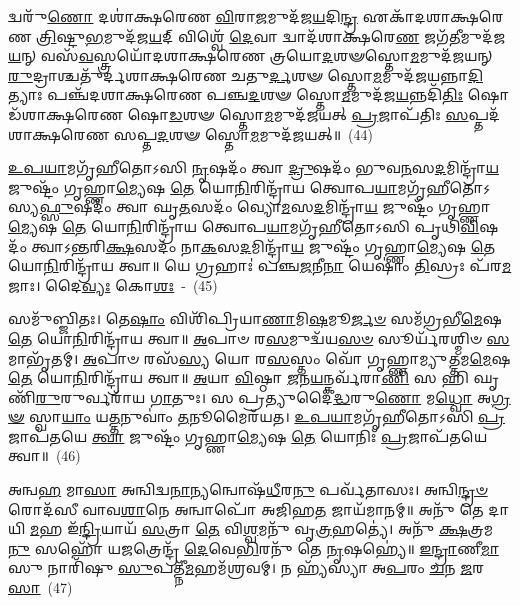 𑌦𑍍𑌵𑌰𑍁᳴\-\ul{𑌣𑍋} 𑌦𑌶𑌾॑𑌕𑍍𑌷𑌰𑍇𑌣 \ul{𑌵𑌿}\-𑌰𑌾\-\ul{𑌜}\-𑌮𑍁𑌦᳴𑌜\-\ul{𑌯}\-𑌦𑌿\-\ul{𑌨𑍍𑌦𑍍𑌰} 𑌏𑌕𑌾᳴\-𑌦𑌶𑌾\-𑌕𑍍𑌷𑌰𑍇𑌣 \ul{𑌤𑍍𑌰𑌿}\-𑌷𑍍𑌟𑍁\-\ul{𑌭}\-𑌮𑍁𑌦᳴𑌜\-\ul{𑌯}\-𑌦𑍍 𑌵𑌿𑌶𑍍𑌵𑍇᳴ \ul{𑌦𑍇}\-𑌵𑌾 𑌦𑍍𑌵𑌾𑌦᳴𑌶𑌾𑌕𑍍𑌷𑌰𑍇\-\ul{𑌣} 𑌜𑌗᳴\-\ul{𑌤𑍀}\-𑌮𑍁𑌦᳴𑌜\-\ul{𑌯}\-𑌨𑍍 𑌵𑌸᳴\-\ul{𑌵}\-𑌸𑍍𑌤𑍍𑌰𑌯𑍋᳴\-𑌦𑌶𑌾\-𑌕𑍍𑌷𑌰𑍇𑌣 𑌤𑍍𑌰𑌯𑍋\-\ul{𑌦}\-𑌶𑍟𑌸𑍍𑌤𑍋\-\ul{𑌮}\-𑌮𑍁𑌦᳴𑌜𑌯𑌨𑍍 \ul{𑌰𑍁}\-𑌦𑍍𑌰𑌾𑌶𑍍𑌚𑌤𑍁᳴𑌰𑍍𑌦𑌶𑌾\-𑌕𑍍𑌷𑌰𑍇𑌣 𑌚𑌤𑍁\-\ul{𑌰𑍍𑌦}\-𑌶𑍟 𑌸𑍍𑌤𑍋\-\ul{𑌮}\-𑌮𑍁𑌦᳴𑌜𑌯𑌨𑍍𑌨𑌾\-\ul{𑌦𑌿}\-𑌤𑍍𑌯𑌾𑌃 𑌪𑌞𑍍𑌚᳴\-𑌦𑌶𑌾\-𑌕𑍍𑌷𑌰𑍇𑌣 𑌪𑌞𑍍𑌚\-\ul{𑌦}\-𑌶𑍟 𑌸𑍍𑌤𑍋\-\ul{𑌮}\-𑌮𑍁𑌦᳴𑌜\-\ul{𑌯}\-𑌨𑍍𑌨𑌦𑌿᳴\-\ul{𑌤𑌿𑌃} 𑌷𑍋𑌡᳴𑌶𑌾𑌕𑍍𑌷𑌰𑍇𑌣 𑌷𑍋\-\ul{𑌡}\-𑌶𑍟 𑌸𑍍𑌤𑍋\-\ul{𑌮}\-𑌮𑍁𑌦᳴𑌜𑌯𑌤𑍍 \ul{𑌪𑍍𑌰}\-𑌜𑌾𑌪᳴𑌤𑌿𑌃 \ul{𑌸}\-𑌪𑍍𑌤𑌦᳴𑌶𑌾𑌕𑍍𑌷𑌰𑍇𑌣 𑌸𑌪𑍍𑌤\-\ul{𑌦}\-𑌶𑍟 𑌸𑍍𑌤𑍋\-\ul{𑌮}\-𑌮𑍁𑌦᳴𑌜𑌯𑌤𑍍॥~(44)

{\anuvakamend[{\-\ul{𑌅}\-\-\ul{𑌜}\-\-\ul{𑌯}\-𑌤𑍍 𑌷𑌟𑍍𑌚᳴𑌤𑍍𑌵𑌾𑌰𑌿𑍞𑌶𑌚𑍍𑌚}]}%

\-\ul{𑌉}\-\-\ul{𑌪}\-\-\ul{𑌯𑌾}\-𑌮𑌗𑍃᳴𑌹𑍀𑌤𑍋\-𑌽𑌸𑌿 \ul{𑌨𑍃}\-𑌷𑌦𑌂᳴ 𑌤𑍍𑌵𑌾 \ul{𑌦𑍍𑌰𑍁}\-𑌷𑌦𑌂᳴ 𑌭𑍁𑌵\-\ul{𑌨}\-𑌸\-\ul{𑌦}\-𑌮𑌿𑌨𑍍𑌦𑍍𑌰𑌾᳴\-\ul{𑌯} 𑌜𑍁𑌷𑍍𑌟𑌂᳴ 𑌗𑍃𑌹𑍍𑌣𑌾\-\ul{𑌮𑍍𑌯𑍇}\-𑌷 \ul{𑌤𑍇} 𑌯𑍋\-\ul{𑌨𑌿}\-𑌰𑌿𑌨𑍍𑌦𑍍𑌰𑌾᳴𑌯 𑌤𑍍𑌵𑍋𑌪\-\ul{𑌯𑌾}\-𑌮𑌗𑍃᳴𑌹𑍀𑌤𑍋\-𑌽𑌸𑍍𑌯\-\ul{𑌫𑍍𑌸𑍁}\-𑌷𑌦𑌂᳴ 𑌤𑍍𑌵𑌾 𑌘𑍃\-\ul{𑌤}\-𑌸𑌦𑌂᳴ 𑌵𑍍𑌯𑍋\-\ul{𑌮}\-𑌸\-\ul{𑌦}\-𑌮𑌿𑌨𑍍𑌦𑍍𑌰𑌾᳴\-\ul{𑌯} 𑌜𑍁𑌷𑍍𑌟𑌂᳴ 𑌗𑍃𑌹𑍍𑌣𑌾\-\ul{𑌮𑍍𑌯𑍇}\-𑌷 \ul{𑌤𑍇} 𑌯𑍋\-\ul{𑌨𑌿}\-𑌰𑌿𑌨𑍍𑌦𑍍𑌰𑌾᳴𑌯 𑌤𑍍𑌵𑍋𑌪\-\ul{𑌯𑌾}\-𑌮𑌗𑍃᳴𑌹𑍀𑌤𑍋\-𑌽𑌸𑌿 𑌪𑍃𑌥𑌿\-\ul{𑌵𑌿}\-𑌷𑌦𑌂᳴ 𑌤𑍍𑌵𑌾\-𑌽𑌨𑍍𑌤𑌰𑌿\-\ul{𑌕𑍍𑌷}\-𑌸𑌦𑌂᳴ 𑌨𑌾\-\ul{𑌕}\-𑌸\-\ul{𑌦}\-𑌮𑌿𑌨𑍍𑌦𑍍𑌰𑌾᳴\-\ul{𑌯} 𑌜𑍁𑌷𑍍𑌟𑌂᳴ 𑌗𑍃𑌹𑍍𑌣𑌾\-\ul{𑌮𑍍𑌯𑍇}\-𑌷 \ul{𑌤𑍇} 𑌯𑍋\-\ul{𑌨𑌿}\-𑌰𑌿𑌨𑍍𑌦𑍍𑌰𑌾᳴𑌯 𑌤𑍍𑌵𑌾॥ 𑌯𑍇 𑌗𑍍𑌰𑌹𑌾𑌃॑ 𑌪𑌞𑍍𑌚\-\ul{𑌜}\-𑌨𑍀\-\ul{𑌨𑌾} 𑌯𑍇𑌷𑌾𑌂॑ \ul{𑌤𑌿}\-𑌸𑍍𑌰𑌃 𑌪᳴𑌰\-\ul{𑌮}\-𑌜𑌾𑌃। 𑌦𑍈\-\ul{𑌵𑍍𑌯𑌃} 𑌕𑍋\-\ul{𑌶𑌃}\-~-~(45)

𑌸𑌮𑍁᳴𑌬𑍍𑌜𑌿𑌤𑌃। 𑌤𑍇\-\ul{𑌷𑌾𑌂} 𑌵𑌿𑌶𑌿᳴𑌪𑍍𑌰𑌿𑌯𑌾\-\ul{𑌣𑌾}\-𑌮𑌿\-\ul{𑌷}\-𑌮𑍂\-\ul{𑌰𑍍𑌜}\-\-\ul{𑍞} 𑌸𑌮᳴𑌗𑍍𑌰𑌭𑍀\-\ul{𑌮𑍇}\-𑌷 \ul{𑌤𑍇} 𑌯𑍋\-\ul{𑌨𑌿}\-𑌰𑌿𑌨𑍍𑌦𑍍𑌰𑌾᳴𑌯 𑌤𑍍𑌵𑌾॥ \ul{𑌅}\-𑌪𑌾𑍞 𑌰\-\ul{𑌸}\-𑌮𑍁𑌦𑍍𑌵᳴𑌯\-\ul{𑌸}\-\-\ul{𑍞} 𑌸𑍂𑌰𑍍𑌯᳴𑌰𑌶𑍍𑌮𑌿𑍞 \ul{𑌸}\-𑌮𑌾𑌭𑍃᳴𑌤𑌮𑍍। \ul{𑌅}\-𑌪𑌾𑍞 𑌰𑌸᳴\-\ul{𑌸𑍍𑌯} 𑌯𑍋 𑌰\-\ul{𑌸}\-𑌸𑍍𑌤𑌂 𑌵𑍋᳴ 𑌗𑍃𑌹𑍍𑌣𑌾𑌮𑍍𑌯𑍁\-\ul{𑌤𑍍𑌤}\-𑌮\-\ul{𑌮𑍇}\-𑌷 \ul{𑌤𑍇} 𑌯𑍋\-\ul{𑌨𑌿}\-𑌰𑌿𑌨𑍍𑌦𑍍𑌰𑌾᳴𑌯 𑌤𑍍𑌵𑌾॥ \ul{𑌅}\-𑌯𑌾 \ul{𑌵𑌿}\-𑌷𑍍𑌠𑌾 \ul{𑌜}\-𑌨\-\ul{𑌯}\-𑌨𑍍𑌕𑌰𑍍𑌵᳴𑌰𑌾\-\ul{𑌣𑌿} 𑌸 𑌹𑌿 𑌘𑍃𑌣𑌿᳴\-\ul{𑌰𑍁}\-𑌰𑍁𑌰𑍍𑌵𑌰𑌾᳴𑌯 \ul{𑌗𑌾}\-𑌤𑍁𑌃। 𑌸 𑌪𑍍𑌰𑌤𑍍𑌯𑍁𑌦𑍈॑\-\ul{𑌦𑍍𑌧}\-𑌰𑍁\-\ul{𑌣𑍋} 𑌮\-\ul{𑌧𑍍𑌵𑍋} 𑌅\-\ul{𑌗𑍍𑌰}\-\-\ul{𑍟} 𑌸𑍍𑌵𑌾\-\ul{𑌯𑌾𑌂} 𑌯\-\ul{𑌤𑍍𑌤}\-𑌨𑍁𑌵𑌾𑌂॑ \ul{𑌤}\-𑌨𑍂𑌮𑍈𑌰᳴𑌯𑌤। \ul{𑌉}\-\-\ul{𑌪}\-\-\ul{𑌯𑌾}\-𑌮𑌗𑍃᳴𑌹𑍀𑌤𑍋\-𑌽𑌸𑌿 \ul{𑌪𑍍𑌰}\-𑌜𑌾𑌪᳴𑌤𑌯𑍇 \ul{𑌤𑍍𑌵𑌾} 𑌜𑍁𑌷𑍍𑌟𑌂᳴ 𑌗𑍃𑌹𑍍𑌣𑌾\-\ul{𑌮𑍍𑌯𑍇}\-𑌷 \ul{𑌤𑍇} 𑌯𑍋𑌨𑌿𑌃᳴ \ul{𑌪𑍍𑌰}\-𑌜𑌾𑌪᳴𑌤𑌯𑍇 𑌤𑍍𑌵𑌾॥~(46)

{\anuvakamend[{𑌕𑍋𑌶᳴\-\ul{𑌸𑍍𑌤}\-𑌨𑍁\-\ul{𑌵𑌾𑌂} 𑌤𑍍𑌰𑌯𑍋᳴𑌦𑌶 𑌚}]}%

𑌅𑌨𑍍𑌵\-\ul{𑌹} 𑌮𑌾\-\ul{𑌸𑌾} 𑌅𑌨𑍍𑌵𑌿𑌦𑍍𑌵\-\ul{𑌨𑌾}\-𑌨𑍍𑌯𑌨𑍍𑌵𑍋𑌷᳴\-\ul{𑌧𑍀}\-𑌰\-\ul{𑌨𑍁} 𑌪𑌰𑍍𑌵᳴𑌤𑌾𑌸𑌃। 𑌅𑌨𑍍𑌵𑌿\-\ul{𑌨𑍍𑌦𑍍𑌰}\-\-\ul{𑍞} 𑌰𑍋𑌦᳴𑌸𑍀 𑌵𑌾𑌵\-\ul{𑌶𑌾}\-𑌨𑍇 𑌅𑌨𑍍𑌵𑌾𑌪𑍋᳴ 𑌅𑌜𑌿𑌹\-\ul{𑌤} 𑌜𑌾𑌯᳴𑌮𑌾𑌨𑌮𑍍॥ 𑌅𑌨𑍁᳴ 𑌤𑍇 𑌦𑌾𑌯𑌿 \ul{𑌮}\-𑌹 𑌇᳴\-\ul{𑌨𑍍𑌦𑍍𑌰𑌿}\-𑌯𑌾𑌯᳴ \ul{𑌸}\-𑌤𑍍𑌰𑌾 \ul{𑌤𑍇} 𑌵𑌿\-\ul{𑌶𑍍𑌵}\-𑌮𑌨𑍁᳴ 𑌵𑍃\-\ul{𑌤𑍍𑌰}\-𑌹𑌤𑍍𑌯𑍇॑। 𑌅𑌨𑍁᳴ \ul{𑌕𑍍𑌷}\-𑌤𑍍𑌰𑌮\-\ul{𑌨𑍁} 𑌸𑌹𑍋᳴ 𑌯\-\ul{𑌜}\-𑌤𑍍𑌰𑍇𑌨𑍍𑌦𑍍𑌰᳴ \ul{𑌦𑍇}\-𑌵𑍇\-\ul{𑌭𑌿}\-𑌰𑌨𑍁᳴ 𑌤𑍇 \ul{𑌨𑍃}\-𑌷𑌹𑍍𑌯𑍇॑॥ \ul{𑌇}\-\-\ul{𑌨𑍍𑌦𑍍𑌰𑌾}\-𑌣𑍀\-\ul{𑌮𑌾}\-𑌸𑍁 𑌨𑌾𑌰𑌿᳴𑌷𑍁 \ul{𑌸𑍁}\-𑌪𑌤𑍍𑌨𑍀᳴\-\ul{𑌮}\-𑌹𑌮᳴𑌶𑍍𑌰𑌵𑌮𑍍। 𑌨 𑌹𑍍𑌯᳴𑌸𑍍𑌯𑌾 𑌅\-\ul{𑌪}\-𑌰𑌂 \ul{𑌚}\-𑌨 \ul{𑌜}\-𑌰\-\ul{𑌸𑌾}\-~(47)

